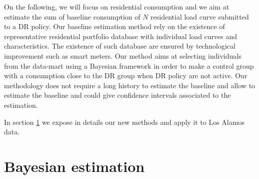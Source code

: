 \documentclass[journal]{IEEEtran}
\begin{document}
On the following, we will focus on residential consumption and we aim
at estimate the sum of baseline consumption of $N$ residential load
curve submitted to a DR policy. Our baseline estimation method rely on
the existence of representative residential portfolio database with
individual load curves and characteristics. The existence of such
database are ensured by technological improvement such as smart
meters. Our method aims at selecting individuals from the data-mart
using a Bayesian framework in order to make a control group with a
consumption close to the DR group when DR policy are not active.  Our
methodology does not require a long history to estimate the baseline
and allow to estimate the baseline and could give confidence intervals
associated to the estimation.

In section \ref{sec:new} we expose
in details our new methods and apply it to Los Alamos data.


\section{Bayesian estimation}\label{sec:new}
\end{document}
